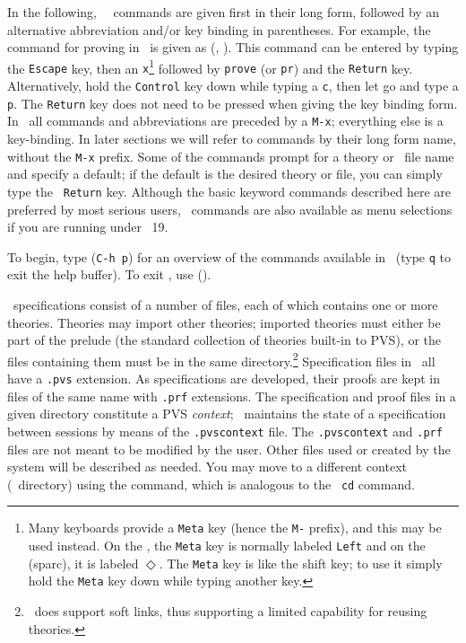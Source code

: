 In the following, \pvs\ \emacs\ commands are given first in their long
form, followed by an alternative abbreviation and/or key binding in
parentheses.  For example, the command for proving in \pvs\ is given
as  (, ).  This command can be entered
by typing the {\tt Escape} key, then an {\tt x}\footnote{Many
keyboards provide a {\tt Meta} key (hence the {\tt M-} prefix), and
this may be used instead.  On the , the {\tt Meta} key is
normally labeled {\tt Left} and on the  ({\sc sparc}), it is
labeled $\Diamond$.  The {\tt Meta} key is like the shift key; to use
it simply hold the {\tt Meta} key down while typing another key.}
followed by {\tt prove} (or {\tt pr}) and the {\tt Return} key.
Alternatively, hold the {\tt Control} key down while typing a {\tt c},
then let go and type a {\tt p}.  The {\tt Return} key does not need to
be pressed when giving the key binding form.  In \pvs\ all commands
and abbreviations are preceded by a {\tt M-x}; everything else is a
key-binding.  In later sections we will refer to commands by their
long form name, without the {\tt M-x} prefix.  Some of the commands
prompt for a theory or \pvs\ file name and specify a default; if the
default is the desired theory or file, you can simply type the {\tt
Return} key.  Although the basic keyword commands described here are
preferred by most serious users, \pvs\ commands are also available as
menu selections if you are running under \emacs\ 19.

To begin, type  ({\tt C-h p}) for an overview of the
commands available in \pvs\ (type {\tt q} to exit the help buffer).
To exit \pvs, use  ().

\pvs\ specifications consist of a number of files, each of which
contains one or more theories.  Theories may import other theories;
imported theories must either be part of the prelude (the standard
collection of theories built-in to PVS), or the files containing them
must be in the same directory.\footnote{\pvs\ does support soft links,
thus supporting a limited capability for reusing theories.}
Specification files in \pvs\ all have a {\tt .pvs} extension.  As
specifications are developed, their proofs are kept in files of the
same name with {\tt .prf} extensions.  The specification and proof
files in a given directory constitute a PVS {\em context\/}; \pvs\
maintains the state of a specification between sessions by means of
the {\tt .pvscontext} file.  The {\tt .pvscontext} and {\tt .prf}
files are not meant to be modified by the user.  Other files used or
created by the system will be described as needed.  You may move to a
different context (\ie\ directory) using the \ecmd{change-context}
command, which is analogous to the \unix\ {\tt cd} command.

